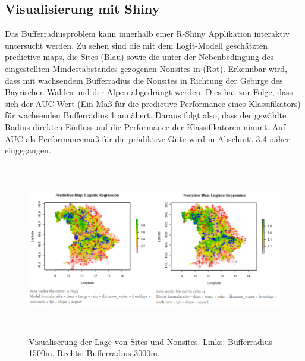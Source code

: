 \subsection{Visualisierung mit Shiny}

Das Bufferradiusproblem kann innerhalb einer R-Shiny Applikation interaktiv untersucht werden. Zu sehen sind die mit dem Logit-Modell geschätzten predictive maps, die Sites (Blau) sowie die unter der Nebenbedingung des eingestellten Mindestabstandes gezogenen Nonsites in (Rot). Erkennbar wird, dass mit wachsendem Bufferradius die Nonsites in Richtung der Gebirge des Bayrischen Waldes und der Alpen abgedrängt werden. Dies hat zur Folge, dass sich der AUC Wert (Ein Maß für die predictive Performance eines Klassifikators) für wachsenden Bufferradius 1 annähert. Daraus folgt also, dass der gewählte Radius direkten Einfluss auf die Performance der Klassifikatoren nimmt. Auf AUC als Performancemaß für die prädiktive Güte wird in Abschnitt 3.4 näher eingegangen. 
\begin{figure}[H]
    \centering
    \includegraphics[width = 15cm, height = 7.5cm]{Figures/shinyfinal.png}
    \caption{Visualiserung der Lage von Sites und Nonsites. Links: Bufferradius 1500m. Rechts: Bufferradius 3000m.}
    \label{shinyfinal}
\end{figure}